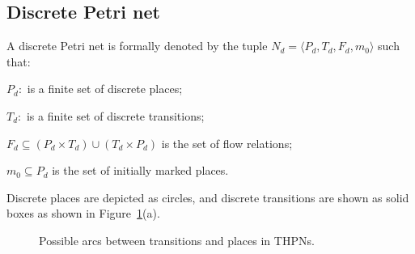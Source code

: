 \documentclass[11pt,times]{article}
\begin{document}
\subsection{\label{dpn_sec}Discrete Petri net}
A discrete Petri net is formally denoted by the tuple
$N_d = \langle P_d, T_d, F_d, m_0 \rangle$ such that:


\begin{description}
\item $P_d:$ is a finite set of discrete places;
\item $T_d:$ is a finite set of discrete transitions;
\item $F_d \subseteq (P_d \times T_d) \cup (T_d \times P_d)$
  is the set of flow relations;
\item $m_0 \subseteq P_d$ is the set of initially marked places.
\end{description}

Discrete places are depicted as circles, and discrete transitions are shown
as solid boxes as shown in Figure~\ref{hpn}(a).  

\begin{figure}[t]
\begin{center}
{\caption{\label{hpn} Possible arcs between
    transitions and places in THPNs.}}
\end{center}
\end{figure}
\end{document}
